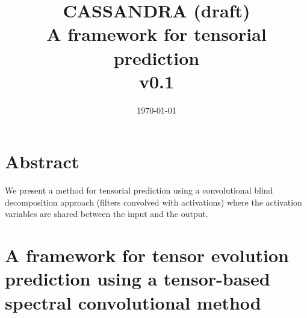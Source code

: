 \documentclass[12pt, a4paper, twoside,draft]{article}
\title{CASSANDRA (draft)\\ A framework for tensorial prediction \\ v0.1}
\date{\today}
\begin{document}
\maketitle

\section{Abstract}
We present a method for tensorial prediction using a convolutional blind decomposition approach (filters convolved with activations) where the activation variables are shared between the input and the output.

\section{A framework for tensor evolution prediction using a tensor-based spectral convolutional method}
\end{document}
